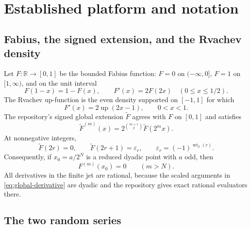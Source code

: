\documentclass[11pt,oneside]{article}
\theoremstyle{frontier}
\theoremstyle{definition}
\theoremstyle{remark}
\newcommand{\R}{\mathbb R}
\newcommand{\GF}{\widetilde F}
\newcommand{\Up}{\operatorname{up}}
\newcommand{\wt}{\operatorname{wt}_2}
\newcommand{\eps}{\varepsilon}
\begin{document}
\section{Established platform and notation}
\label{sec:platform}

\subsection{Fabius, the signed extension, and the Rvachev density}

Let $F:\R\to[0,1]$ be the bounded Fabius function: $F=0$ on $(-\infty,0]$,
$F=1$ on $[1,\infty)$, and on the unit interval
\begin{equation}
 F(1-x)=1-F(x),\qquad F'(x)=2F(2x)\quad(0\le x\le1/2).
 \label{eq:F-basic}
\end{equation}
The Rvachev up-function is the even density supported on $[-1,1]$ for which
\begin{equation}
 F'(x)=2\Up(2x-1),\qquad 0<x<1.
 \label{eq:Fprime-up}
\end{equation}
The repository's signed global extension $\GF$ agrees with $F$ on $[0,1]$ and satisfies
\begin{equation}
 \GF^{(m)}(x)=2^{\binom{m+1}{2}}\GF(2^m x).
 \label{eq:global-derivative}
\end{equation}
At nonnegative integers,
\begin{equation}
 \GF(2r)=0,\qquad \GF(2r+1)=\eps_r,
 \qquad \eps_r=(-1)^{\wt(r)}.
 \label{eq:integer-global}
\end{equation}
Consequently, if $x_0=a/2^N$ is a reduced dyadic point with $a$ odd, then
\begin{equation}
 F^{(m)}(x_0)=0\qquad(m>N).
 \label{eq:dyadic-vanish}
\end{equation}
All derivatives in the finite jet are rational, because the scaled arguments in
\eqref{eq:global-derivative} are dyadic and the repository gives exact rational evaluators there.

\subsection{The two random series}
\end{document}
